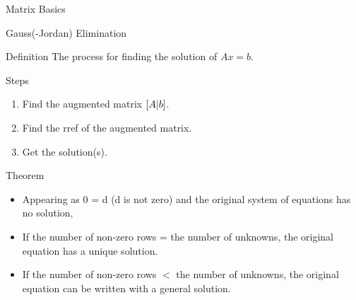 \documentclass{beamer}
\begin{document}
\begin{section}{Matrix Basics}
\begin{frame}[label=9]{Gauss(-Jordan) Elimination}
    \par \begin{block}{Definition} 
    The process for finding the solution of $Ax=b$.
    \end{block}

    \pause
    \par
    \begin{block}{Steps}
        \begin{enumerate}
            \item Find the augmented matrix $\LARGE[A\Large | b\LARGE]$.
            \item Find the rref of the augmented matrix.
            \item Get the solution(s).
        \end{enumerate}
    \end{block}
\end{frame}

\begin{frame}
    \par \begin{block}{Theorem}  
        \begin{itemize}
            \item Appearing as 0 = d (d is not zero) and the original system of equations has no solution, 
            \item If the number of non-zero rows = the number of unknowns, the original equation has a unique solution.
            \item If the number of non-zero rows $<$ the number of unknowns, the original equation can be written with a general solution.
        \end{itemize}
        \end{block}

\end{frame}








\end{section}
\end{document}
